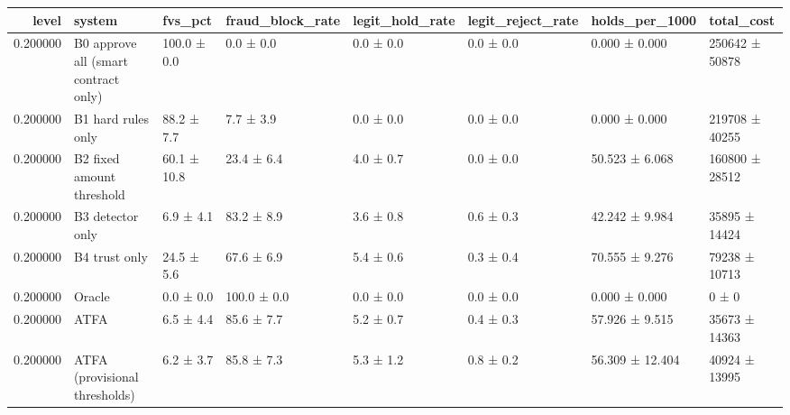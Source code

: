 \begin{tabular}{rlllllll}
\toprule
level & system & fvs\_pct & fraud\_block\_rate & legit\_hold\_rate & legit\_reject\_rate & holds\_per\_1000 & total\_cost \\
\midrule
0.200000 & B0 approve all (smart contract only) & 100.0 ± 0.0 & 0.0 ± 0.0 & 0.0 ± 0.0 & 0.0 ± 0.0 & 0.000 ± 0.000 & 250642 ± 50878 \\
0.200000 & B1 hard rules only & 88.2 ± 7.7 & 7.7 ± 3.9 & 0.0 ± 0.0 & 0.0 ± 0.0 & 0.000 ± 0.000 & 219708 ± 40255 \\
0.200000 & B2 fixed amount threshold & 60.1 ± 10.8 & 23.4 ± 6.4 & 4.0 ± 0.7 & 0.0 ± 0.0 & 50.523 ± 6.068 & 160800 ± 28512 \\
0.200000 & B3 detector only & 6.9 ± 4.1 & 83.2 ± 8.9 & 3.6 ± 0.8 & 0.6 ± 0.3 & 42.242 ± 9.984 & 35895 ± 14424 \\
0.200000 & B4 trust only & 24.5 ± 5.6 & 67.6 ± 6.9 & 5.4 ± 0.6 & 0.3 ± 0.4 & 70.555 ± 9.276 & 79238 ± 10713 \\
0.200000 & Oracle & 0.0 ± 0.0 & 100.0 ± 0.0 & 0.0 ± 0.0 & 0.0 ± 0.0 & 0.000 ± 0.000 & 0 ± 0 \\
0.200000 & ATFA & 6.5 ± 4.4 & 85.6 ± 7.7 & 5.2 ± 0.7 & 0.4 ± 0.3 & 57.926 ± 9.515 & 35673 ± 14363 \\
0.200000 & ATFA (provisional thresholds) & 6.2 ± 3.7 & 85.8 ± 7.3 & 5.3 ± 1.2 & 0.8 ± 0.2 & 56.309 ± 12.404 & 40924 ± 13995 \\
\bottomrule
\end{tabular}
